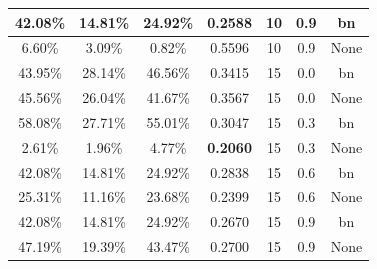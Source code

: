 \begin{table}[ht]
\begin{tabular}{|c|c|c|c|c|c|c|}
42.08\% & 14.81\% & 24.92\% & 0.2588 & 10 & 0.9 & bn\\ \hline
6.60\% & 3.09\% & 0.82\% & 0.5596 & 10 & 0.9 & None\\ \hline
43.95\% & 28.14\% & 46.56\% & 0.3415 & 15 & 0.0 & bn\\ \hline
45.56\% & 26.04\% & 41.67\% & 0.3567 & 15 & 0.0 & None\\ \hline
58.08\% & 27.71\% & 55.01\% & 0.3047 & 15 & 0.3 & bn\\ \hline
2.61\% & 1.96\% & 4.77\% & \textbf{0.2060} & 15 & 0.3 & None\\ \hline
42.08\% & 14.81\% & 24.92\% & 0.2838 & 15 & 0.6 & bn\\ \hline
25.31\% & 11.16\% & 23.68\% & 0.2399 & 15 & 0.6 & None\\ \hline
42.08\% & 14.81\% & 24.92\% & 0.2670 & 15 & 0.9 & bn\\ \hline
47.19\% & 19.39\% & 43.47\% & 0.2700 & 15 & 0.9 & None\\ \hline
\end{tabular}
\end{table}

